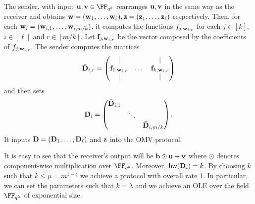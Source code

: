 The sender, with input $\un,\vn\in\FF_{q^k}$ rearranges $\mathbf{u},\mathbf{v}$ in the same way as the receiver and obtains $\mathbf{w}=(\mathbf{w}_1,\dots, \mathbf{w}_\ell),\mathbf{z}=(\mathbf{z}_1,\dots, \mathbf{z}_\ell)$ respectively. Then, for each $\mathbf{w}_i=(\mathbf{w}_{i,1},\dots, \mathbf{w}_{i,m/k})$, it computes the functions $f_{j,\mathbf{w}_{i,r}}$ for each $j\in[k]$, $i\in[\ell]$ and $r\in[m/k]$. Let $\mathbf{f}_{j,\mathbf{w}_{i,r}}$ be the vector composed by the coefficients of $f_{j,\mathbf{w}_{i,r}}$. The sender computes the matrices $$\bar {\mathbf{D}}_{i,r}=\begin{pmatrix} | & &| \\ \mathbf{f}_{1,\mathbf{w}_{i,r}} & \dots & \mathbf{f}_{k,\mathbf{w}_{i,r}} \\| & & |\end{pmatrix}$$ and then sets $$\mathbf{D}_i=\begin{pmatrix} \bar {\mathbf{D}}_{i,1} &  & \\  & \ddots &  \\ & & \bar {\mathbf{D}}_{i,m/k}\end{pmatrix}.$$ It inputs $\mathbf{D}=(\mathbf{D}_1,\dots, \mathbf{D}_\ell)$ and $\mathbf{z}$ into the OMV protocol. 

It is easy to see that the receiver's output will be $\mathbf{b}\odot \mathbf{u} + \mathbf{v}$ where $\odot$ denotes component-wise multiplication over $\FF_{q^k}$. Moreover, $\mathsf{hw}(\mathbf{D}_i)= k$. By choosing $k$ such that $k \leq  \mu=m^{1-\zeta}$ we achieve a protocol with overall rate 1. In particular, we can set the parameters such that $k=\lambda$ and we achieve an OLE over the field  $\FF_{q^\lambda}$ of exponential size.

